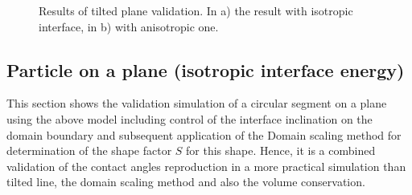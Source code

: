	\begin{figure}
		\centering
		\caption[Results of tilted plane validation]{Results of tilted plane validation. In a) the result with isotropic interface, in b) with anisotropic one. }
		\label{fig_tilted_plane_validation_results}
	\end{figure}
	
	\subsection{Particle on a plane (isotropic interface energy)}
	This section shows the validation simulation of a circular segment on a plane using the above model including control of the interface inclination on the domain boundary and subsequent application of the Domain scaling method for determination of the shape factor $S$ for this shape. Hence, it is a combined validation of the contact angles reproduction in a more practical simulation than tilted line, the domain scaling method and also the volume conservation.
	
